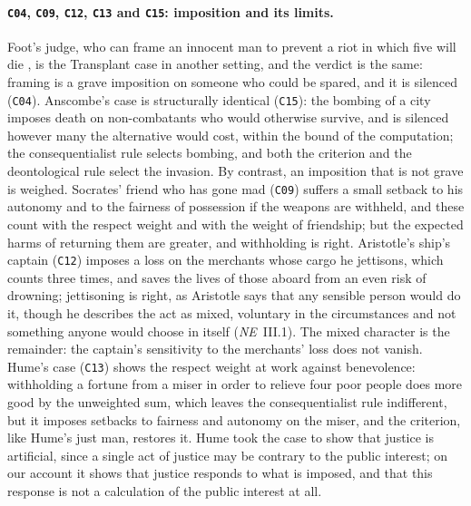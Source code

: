 \documentclass{situationist-preprint}
\begin{document}
\paragraph{\texttt{C04}, \texttt{C09}, \texttt{C12}, \texttt{C13} and \texttt{C15}: imposition and its limits.} Foot's judge, who can frame an innocent man to prevent a riot in which five will die \citep{Foot1967}, is the Transplant case in another setting, and the verdict is the same: framing is a grave imposition on someone who could be spared, and it is silenced (\texttt{C04}). Anscombe's case is structurally identical (\texttt{C15}): the bombing of a city imposes death on non-combatants who would otherwise survive, and is silenced however many the alternative would cost, within the bound of the computation; the consequentialist rule selects bombing, and both the criterion and the deontological rule select the invasion. By contrast, an imposition that is not grave is weighed. Socrates' friend who has gone mad (\texttt{C09}) suffers a small setback to his autonomy and to the fairness of possession if the weapons are withheld, and these count with the respect weight and with the weight of friendship; but the expected harms of returning them are greater, and withholding is right. Aristotle's ship's captain (\texttt{C12}) imposes a loss on the merchants whose cargo he jettisons, which counts three times, and saves the lives of those aboard from an even risk of drowning; jettisoning is right, as Aristotle says that any sensible person would do it, though he describes the act as mixed, voluntary in the circumstances and not something anyone would choose in itself (\emph{NE}~III.1). The mixed character is the remainder: the captain's sensitivity to the merchants' loss does not vanish. Hume's case (\texttt{C13}) shows the respect weight at work against benevolence: withholding a fortune from a miser in order to relieve four poor people does more good by the unweighted sum, which leaves the consequentialist rule indifferent, but it imposes setbacks to fairness and autonomy on the miser, and the criterion, like Hume's just man, restores it. Hume took the case to show that justice is artificial, since a single act of justice may be contrary to the public interest; on our account it shows that justice responds to what is imposed, and that this response is not a calculation of the public interest at all.
\end{document}
